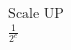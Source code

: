 \documentclass[preview]{standalone}
\begin{document}
\begin{align*}
\text{Scale UP} \\ \frac{1}{2^e}
\end{align*}
\end{document}
